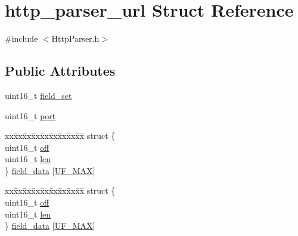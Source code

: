 \hypertarget{structhttp__parser__url}{}\section{http\+\_\+parser\+\_\+url Struct Reference}
\label{structhttp__parser__url}


{\ttfamily \#include $<$Http\+Parser.\+h$>$}

\subsection*{Public Attributes}
\begin{DoxyCompactItemize}
\item 
uint16\+\_\+t \hyperlink{structhttp__parser__url_a77af61a480f11c41938810dd76ca49eb}{field\+\_\+set}
\item 
uint16\+\_\+t \hyperlink{structhttp__parser__url_a875fb8faf3ee45707078eda5435fa563}{port}
\item 
\begin{tabbing}
xx\=xx\=xx\=xx\=xx\=xx\=xx\=xx\=xx\=\kill
struct \{\\
\>uint16\_t \hyperlink{structhttp__parser__url_a6510826f3aa9a1100ac5f714323edeb1}{off}\\
\>uint16\_t \hyperlink{structhttp__parser__url_a60fb784a989dd5a95e5bd19d468d22c7}{len}\\
\} \hyperlink{structhttp__parser__url_a7a13fbad518cfd159eaba777f202150a}{field\_data} \mbox{[}\hyperlink{http__parser_8h_a9ca1f91c2958091e2ac9e9b2f903d4eba4b40c88291e4fa018de04553e7e1adfd}{UF\_MAX}\mbox{]}\\

\end{tabbing}\item 
\begin{tabbing}
xx\=xx\=xx\=xx\=xx\=xx\=xx\=xx\=xx\=\kill
struct \{\\
\>uint16\_t \hyperlink{structhttp__parser__url_a6510826f3aa9a1100ac5f714323edeb1}{off}\\
\>uint16\_t \hyperlink{structhttp__parser__url_a60fb784a989dd5a95e5bd19d468d22c7}{len}\\
\} \hyperlink{structhttp__parser__url_abbbd8851df7a76adb38e7eea4c51840c}{field\_data} \mbox{[}\hyperlink{http__parser_8h_a9ca1f91c2958091e2ac9e9b2f903d4eba4b40c88291e4fa018de04553e7e1adfd}{UF\_MAX}\mbox{]}\\

\end{tabbing}\end{DoxyCompactItemize}


